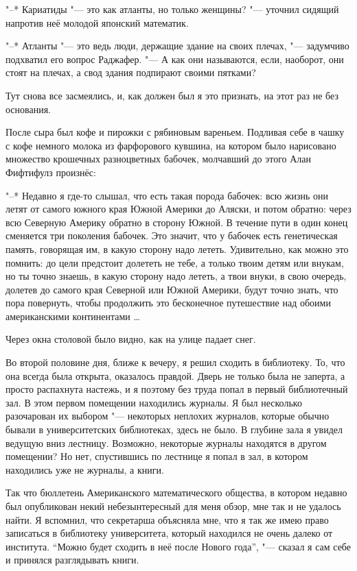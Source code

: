 "--* Кариатиды "--- это как атланты, но только женщины? "--- уточнил сидящий
напротив неё молодой японский математик.

"--* Атланты "--- это ведь люди, держащие здание на своих плечах, "---
задумчиво подхватил его вопрос Раджафер.
"--- А как они называются, если, наоборот, они стоят на плечах, а свод здания
подпирают своими пятками?

Тут снова все засмеялись, и, как должен был я это признать, на этот раз не без
основания.

После сыра был кофе и пирожки с рябиновым вареньем.
Подливая себе в чашку с кофе немного молока из фарфорового кувшина, на котором
было нарисовано множество крошечных разноцветных бабочек, молчавший до этого
Алан Фифтифулз произнёс:

"--* Недавно я где-то слышал, что есть такая порода бабочек:
всю жизнь они летят от самого южного края Южной Америки до Аляски, и потом
обратно: через всю Северную Америку обратно в сторону Южной.
В течение пути в один конец сменяется три поколения бабочек.
Это значит, что у бабочек есть генетическая память, говорящая им, в какую
сторону надо лететь.
Удивительно, как можно это помнить:
до цели предстоит долететь не тебе, а только твоим детям или внукам, но ты точно
знаешь, в какую сторону надо лететь, а твои внуки, в свою очередь, долетев до
самого края Северной или Южной Америки, будут точно знать, что пора повернуть,
чтобы продолжить это бесконечное путешествие над обоими американскими
континентами \ldots

Через окна столовой было видно, как на улице падает снег.

Во второй половине дня, ближе к вечеру, я решил сходить в библиотеку.
То, что она всегда была открыта, оказалось правдой.
Дверь не только была не заперта, а просто распахнута настежь, и я поэтому без
труда попал в первый библиотечный зал.
В этом первом помещении находились журналы.
Я был несколько разочарован их выбором "--- некоторых неплохих журналов,
которые обычно бывали в университетских библиотеках, здесь не было.
В глубине зала я увидел ведущую вниз лестницу.
Возможно, некоторые журналы находятся в другом помещении?
Но нет, спустившись по лестнице я попал в зал, в котором находились уже не
журналы, а книги.

Так что бюллетень Американского математического общества, в котором недавно был
опубликован некий небезынтересный для меня обзор, мне так и не удалось найти.
Я вспомнил, что секретарша объясняла мне, что я так же имею право записаться в
библиотеку университета, который находился не очень далеко от института.
\enquote{Можно будет сходить в неё после Нового года}, "--- сказал я сам себе и
принялся разглядывать книги.

